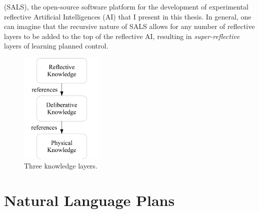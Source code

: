 (SALS), the open-source software platform for the development of
experimental reflective Artificial Intelligences (AI) that I present
in this thesis.  In general, one can imagine that the recursive nature
of SALS allows for any number of reflective layers to be added to the
top of the reflective AI, resulting in \emph{super-reflective} layers
of learning planned control.
\begin{figure}
  \center
  \includegraphics[width=4cm]{gfx/three_knowledge_layers}
  \caption{Three knowledge layers.}
  \label{figure:three_knowledge_layers}
\end{figure}

\section{Natural Language Plans}

